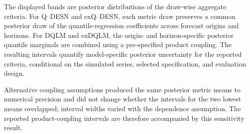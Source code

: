 The displayed bands are posterior distributions of the draw-wise aggregate criteria. For Q--DESN and exQ--DESN, each metric draw preserves a common posterior draw of the quantile-regression coefficients across forecast origins and horizons. For DQLM and exDQLM, the origin- and horizon-specific posterior quantile marginals are combined using a pre-specified product coupling. The resulting intervals quantify model-specific posterior uncertainty for the reported criteria, conditional on the simulated series, selected specification, and evaluation design.

Alternative coupling assumptions produced the same posterior metric means to numerical precision and did not change whether the intervals for the two lowest means overlapped; interval widths varied with the dependence assumption. The reported product-coupling intervals are therefore accompanied by this sensitivity result.
